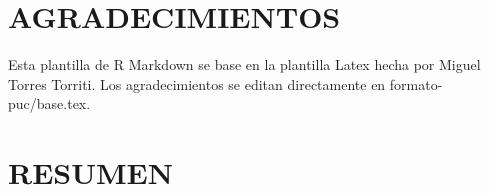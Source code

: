 \documentclass[12pt,reqno,oneside,pdftex]{formato-puc/puctesis} %
\begin{document}


\chapter*{AGRADECIMIENTOS}
Esta plantilla de R Markdown se base en la plantilla Latex hecha por
Miguel Torres Torriti. Los agradecimientos se editan directamente en formato-puc/base.tex.
\par


\cleardoublepage %



\tableofcontents
\listoffigures          
\listoftables           
\cleardoublepage %




\chapter*{RESUMEN}
\end{document}
